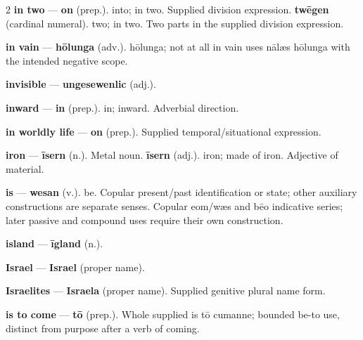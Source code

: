 \begin{multicols}{2}
\textbf{in two} — \textbf{on} (prep.). into; in two. Supplied division expression. \textbf{twēgen} (cardinal numeral). two; in two. Two parts in the supplied division expression.\par
\textbf{in vain} — \textbf{hōlunga} (adv.). hōlunga; not at all in vain uses nālæs hōlunga with the intended negative scope.\par
\textbf{invisible} — \textbf{ungesewenlic} (adj.).\par
\textbf{inward} — \textbf{in} (prep.). in; inward. Adverbial direction.\par
\textbf{in worldly life} — \textbf{on} (prep.). Supplied temporal/situational expression.\par
\textbf{iron} — \textbf{īsern} (n.). Metal noun. \textbf{īsern} (adj.). iron; made of iron. Adjective of material.\par
\textbf{is} — \textbf{wesan} (v.). be. Copular present/past identification or state; other auxiliary constructions are separate senses. Copular eom/wæs and bēo indicative series; later passive and compound uses require their own construction.\par
\textbf{island} — \textbf{īgland} (n.).\par
\textbf{Israel} — \textbf{Israel} (proper name).\par
\textbf{Israelites} — \textbf{Israela} (proper name). Supplied genitive plural name form.\par
\textbf{is to come} — \textbf{tō} (prep.). Whole supplied is tō cumanne; bounded be-to use, distinct from purpose after a verb of coming.\par

\end{multicols}
